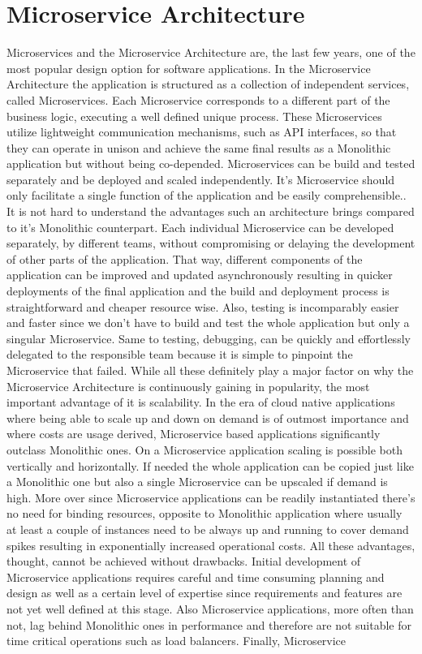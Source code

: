 \documentclass[greek,english]{article}
\begin{document}
\section{Microservice Architecture}

Microservices and the Microservice Architecture are, the last few years, one of the most popular design option for software applications. In the Microservice Architecture the application is structured as a collection of independent services, called Microservices. Each Microservice corresponds to a different part of the business logic, executing a well defined unique process\cite{monovsmicro}\cite{microservicesdef}. These Microservices utilize lightweight communication mechanisms, such as API interfaces, so that they can operate in unison and achieve the same final results as a Monolithic application but without being co-depended. Microservices can be build and tested separately and be deployed and scaled independently. It's Microservice should only facilitate a single function of the application and be easily comprehensible.\cite{chandrinos_thesis}. It is not hard to understand the advantages such an architecture brings compared to it's Monolithic counterpart. Each individual Microservice can be developed separately, by different teams, without compromising or delaying the development of other parts of the application. That way, different components of the application can be improved and updated asynchronously resulting in quicker deployments of the final application and the build and deployment process is straightforward and cheaper resource wise. Also, testing is incomparably easier and faster since we don't have to build and test the whole application but only a singular Microservice. Same to testing, debugging, can be quickly and effortlessly delegated to the responsible team because it is simple to pinpoint the Microservice that failed. While all these definitely play a major factor on why the Microservice Architecture is continuously gaining in popularity, the most important advantage of it is scalability. In the era of cloud native applications where being able to scale up and down on demand is of outmost importance and where costs are usage derived, Microservice based applications significantly outclass Monolithic ones. On a Microservice application scaling is possible both vertically and horizontally. If needed the whole application can be copied just like a Monolithic one but also a single Microservice can be upscaled if demand is high. More over since Microservice applications can be readily instantiated there's no need for binding resources, opposite to Monolithic application where usually at least a couple of instances need to be always up and running to cover demand spikes resulting in exponentially increased operational costs. All these advantages, thought, cannot be achieved without drawbacks. Initial development of Microservice applications requires careful and time consuming planning and design as well as a certain level of expertise since requirements and features are not yet well defined at this stage. Also Microservice applications, more often than not, lag behind Monolithic ones in performance and therefore are not suitable for time critical operations such as load balancers. Finally, Microservice 
\end{document}
